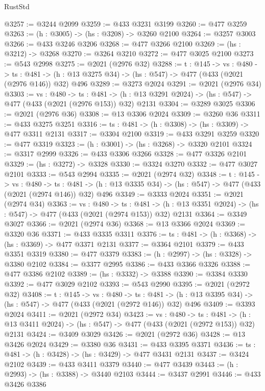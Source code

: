 \begin{lexlean}{RustStd}
\begin{coremodule}
@3257 := @3244 @2099
@3259 := @433 @3231 @3199
@3260 := @477 @3259
@3263 := (h : @3005) -> (hs : @3208) -> @3260 @2100
@3264 := @3257 @3003
@3266 := @433 @3246 @3206
@3268 := @477 @3266 @2100
@3269 := (hs : @3212) -> @3268
@3270 := @3264 @3210
@3272 := @477 @3025 @2100
@3273 := @543 @2998
@3275 := @2021 (@2976 @32)
@3288 := {t : @145} ->
  {vs : @480} ->
  {ts : @481} -> (h : @13 @3275 @34) -> (hs : @547) -> @477 (@433 (@2021 (@2976 @146)) @32) @496
@3289 := @3273 @2024
@3291 := @2021 (@2976 @34)
@3303 := {vs : @480} ->
  {ts : @481} -> (h : @13 @3291 @2024) -> (hs : @547) -> @477 (@433 (@2021 (@2976 @153)) @32) @2131
@3304 := @3289 @3025
@3306 := @2021 (@2976 @36)
@3308 := @13 @3306 @2024
@3309 := @3260 @36
@3311 := @433 @3275 @3251
@3316 := {ts : @481} -> (h : @3308) -> (hs : @3309) -> @477 @3311 @2131
@3317 := @3304 @2100
@3319 := @433 @3291 @3259
@3320 := @477 @3319
@3323 := (h : @3001) -> (hs : @3268) -> @3320 @2101
@3324 := @3317 @2999
@3326 := @433 @3306 @3266
@3328 := @477 @3326 @2101
@3329 := (hs : @3272) -> @3328
@3330 := @3324 @3270
@3332 := @477 @3027 @2101
@3333 := @543 @2994
@3335 := @2021 (@2974 @32)
@3348 := {t : @145} ->
  {vs : @480} ->
  {ts : @481} -> (h : @13 @3335 @34) -> (hs : @547) -> @477 (@433 (@2021 (@2974 @146)) @32) @496
@3349 := @3333 @2024
@3351 := @2021 (@2974 @34)
@3363 := {vs : @480} ->
  {ts : @481} -> (h : @13 @3351 @2024) -> (hs : @547) -> @477 (@433 (@2021 (@2974 @153)) @32) @2131
@3364 := @3349 @3027
@3366 := @2021 (@2974 @36)
@3368 := @13 @3366 @2024
@3369 := @3320 @36
@3371 := @433 @3335 @3311
@3376 := {ts : @481} -> (h : @3368) -> (hs : @3369) -> @477 @3371 @2131
@3377 := @3364 @2101
@3379 := @433 @3351 @3319
@3380 := @477 @3379
@3383 := (h : @2997) -> (hs : @3328) -> @3380 @2102
@3384 := @3377 @2995
@3386 := @433 @3366 @3326
@3388 := @477 @3386 @2102
@3389 := (hs : @3332) -> @3388
@3390 := @3384 @3330
@3392 := @477 @3029 @2102
@3393 := @543 @2990
@3395 := @2021 (@2972 @32)
@3408 := {t : @145} ->
  {vs : @480} ->
  {ts : @481} -> (h : @13 @3395 @34) -> (hs : @547) -> @477 (@433 (@2021 (@2972 @146)) @32) @496
@3409 := @3393 @2024
@3411 := @2021 (@2972 @34)
@3423 := {vs : @480} ->
  {ts : @481} -> (h : @13 @3411 @2024) -> (hs : @547) -> @477 (@433 (@2021 (@2972 @153)) @32) @2131
@3424 := @3409 @3029
@3426 := @2021 (@2972 @36)
@3428 := @13 @3426 @2024
@3429 := @3380 @36
@3431 := @433 @3395 @3371
@3436 := {ts : @481} -> (h : @3428) -> (hs : @3429) -> @477 @3431 @2131
@3437 := @3424 @2102
@3439 := @433 @3411 @3379
@3440 := @477 @3439
@3443 := (h : @2993) -> (hs : @3388) -> @3440 @2103
@3444 := @3437 @2991
@3446 := @433 @3426 @3386

\end{coremodule}
\end{lexlean}
